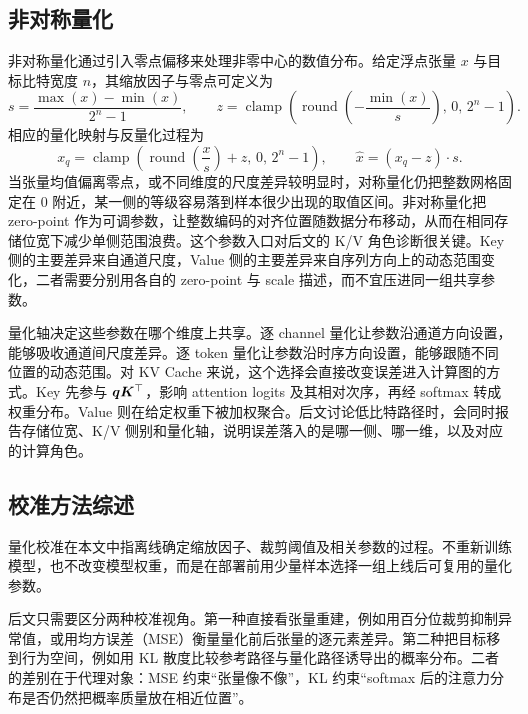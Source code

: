 \subsection{非对称量化}

非对称量化通过引入零点偏移来处理非零中心的数值分布。给定浮点张量 $x$ 与目标比特宽度 $n$，其缩放因子与零点可定义为
\begin{equation}
s = \frac{\max(x)-\min(x)}{2^n-1}, \qquad
z = \operatorname{clamp}\!\left(\operatorname{round}\!\left(-\frac{\min(x)}{s}\right),\,0,\,2^n-1\right).
  \label{eq:asym_params}
\end{equation}
相应的量化映射与反量化过程为
\begin{equation}
x_q = \operatorname{clamp}\!\left(\operatorname{round}\!\left(\frac{x}{s}\right)+z,\,0,\,2^n-1\right), \qquad
\hat{x} = (x_q-z)\cdot s.
  \label{eq:asym_quant}
\end{equation}
当张量均值偏离零点，或不同维度的尺度差异较明显时，对称量化仍把整数网格固定在 0 附近，某一侧的等级容易落到样本很少出现的取值区间。非对称量化把 zero-point 作为可调参数，让整数编码的对齐位置随数据分布移动，从而在相同存储位宽下减少单侧范围浪费。这个参数入口对后文的 K/V 角色诊断很关键。Key 侧的主要差异来自通道尺度，Value 侧的主要差异来自序列方向上的动态范围变化，二者需要分别用各自的 zero-point 与 scale 描述，而不宜压进同一组共享参数。

量化轴决定这些参数在哪个维度上共享。逐 channel 量化让参数沿通道方向设置，能够吸收通道间尺度差异。逐 token 量化让参数沿时序方向设置，能够跟随不同位置的动态范围。对 KV Cache 来说，这个选择会直接改变误差进入计算图的方式。Key 先参与 $\bm{q}\bm{K}^\top$，影响 attention logits 及其相对次序，再经 softmax 转成权重分布。Value 则在给定权重下被加权聚合。后文讨论低比特路径时，会同时报告存储位宽、K/V 侧别和量化轴，说明误差落入的是哪一侧、哪一维，以及对应的计算角色。

\subsection{校准方法综述}

量化校准在本文中指离线确定缩放因子、裁剪阈值及相关参数的过程。不重新训练模型，也不改变模型权重，而是在部署前用少量样本选择一组上线后可复用的量化参数。

后文只需要区分两种校准视角。第一种直接看张量重建，例如用百分位裁剪抑制异常值，或用均方误差（MSE）衡量量化前后张量的逐元素差异。第二种把目标移到行为空间，例如用 KL 散度比较参考路径与量化路径诱导出的概率分布。二者的差别在于代理对象：MSE 约束“张量像不像”，KL 约束“softmax 后的注意力分布是否仍然把概率质量放在相近位置”。

